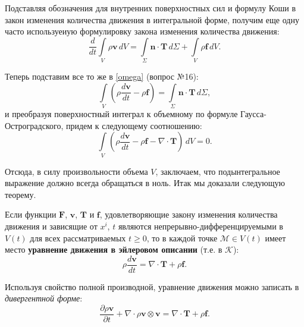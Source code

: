 
Подставляя обозначения для внутренних поверхностных сил и формулу Коши в закон изменения количества движения в интегральной форме, получим еще одну часто используеиую формулировку закона изменения количества движения:
\begin{equation*}
	\frac{d}{dt} \int\limits_{V} \rho \mathbf{v} \, dV = \int\limits_{\Sigma} \mathbf{n} \cdot \mathbf{T} \, d\Sigma + \int\limits_{V} \rho \mathbf{f} \, dV.
\end{equation*}

Теперь подставим все то же в \eqref{omega} (вопрос №16):
\begin{equation*}
	\int\limits_{V} \left(\rho \frac{d\mathbf{v}}{dt} - \rho \mathbf{f}\right) = \int\limits_{\Sigma} \mathbf{n} \cdot \mathbf{T} \, d\Sigma,
\end{equation*}
и преобразуя поверхностный интеграл к объемному по формуле Гаусса-Остроградского, придем к следующему соотношению:
\begin{equation*}
	\int\limits_{V} \left(\rho \frac{d \mathbf{v}}{dt} - \rho \mathbf{f} - \nabla \cdot \mathbf{T}\right) \, dV = 0.
\end{equation*}

Отсюда, в силу произвольности объема $V$, заключаем, что подынтегральное выражение должно всегда обращаться в ноль. Итак мы доказали следующую теорему.

\begin{theorem*}
	Если функции $\mathbf{F}$, $\mathbf{v}$, $\mathbf{T}$ и $\mathbf{f}$, удовлетворяющие закону изменения количества движения и зависящие от $x^i$, $t$ являются непрерывно-дифференцируемыми в $V(t)$ для всех рассматриваемых $t \geqslant 0$, то в каждой точке $\mathcal{M} \in V(t)$ имеет место \textbf{уравнение движения в эйлеровом описании} (т.е. в $\mathcal{K}$):
	\begin{equation*}
		\rho \frac{d\mathbf{v}}{dt} = \nabla \cdot \mathbf{T} + \rho \mathbf{f}.
	\end{equation*}
\end{theorem*}


Используя свойство полной производной, уравнение движения можно записать в \textit{дивергентной форме}:
\begin{equation*}
	\frac{\partial \rho \mathbf{v}}{\partial t} + \nabla \cdot \rho \mathbf{v} \otimes \mathbf{v} = \nabla \cdot \mathbf{T} + \rho \mathbf{f}.
\end{equation*}

